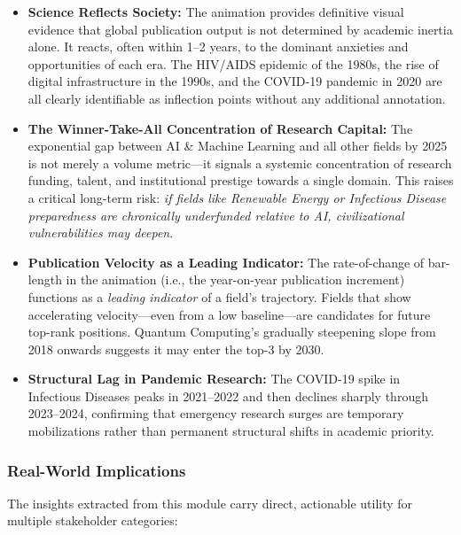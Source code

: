 \documentclass[12pt,a4paper]{article}
\begin{document}
\begin{itemize}
    \item \textbf{Science Reflects Society:} The animation provides definitive visual
    evidence that global publication output is not determined by academic inertia alone.
    It reacts, often within 1--2 years, to the dominant anxieties and opportunities of
    each era. The HIV/AIDS epidemic of the 1980s, the rise of digital infrastructure in
    the 1990s, and the COVID-19 pandemic in 2020 are all clearly identifiable as
    inflection points without any additional annotation.

    \item \textbf{The Winner-Take-All Concentration of Research Capital:} The exponential
    gap between AI \& Machine Learning and all other fields by 2025 is not merely a
    volume metric---it signals a systemic concentration of research funding, talent, and
    institutional prestige towards a single domain. This raises a critical long-term risk:
    \textit{if fields like Renewable Energy or Infectious Disease preparedness are
    chronically underfunded relative to AI, civilizational vulnerabilities may deepen}.

    \item \textbf{Publication Velocity as a Leading Indicator:} The rate-of-change of
    bar-length in the animation (i.e., the year-on-year publication increment) functions
    as a \textit{leading indicator} of a field's trajectory. Fields that show accelerating
    velocity---even from a low baseline---are candidates for future top-rank positions.
    Quantum Computing's gradually steepening slope from 2018 onwards suggests it may
    enter the top-3 by 2030.

    \item \textbf{Structural Lag in Pandemic Research:} The COVID-19 spike in Infectious
    Diseases peaks in 2021--2022 and then declines sharply through 2023--2024, confirming
    that emergency research surges are temporary mobilizations rather than permanent
    structural shifts in academic priority.
\end{itemize}

\subsubsection{Real-World Implications}
The insights extracted from this module carry direct, actionable utility for multiple
stakeholder categories:
\end{document}
